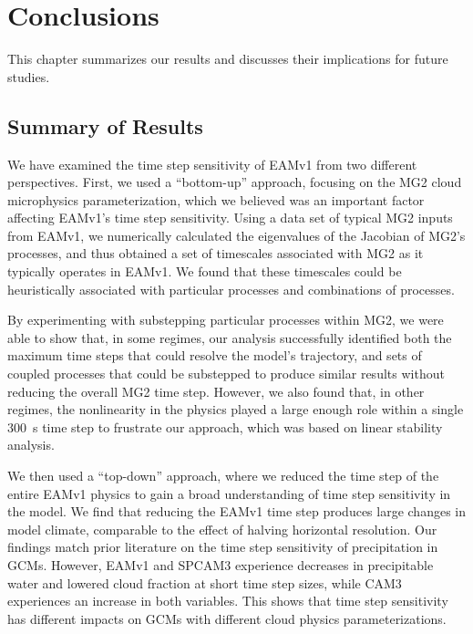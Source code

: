 \documentclass [11pt, proquest] {uwthesis}[2020/02/24]
\begin{document}
\chapter{Conclusions} \label{ch:conclusions}

This chapter summarizes our results and discusses their implications for future studies.

\section{Summary of Results} \label{sec:summary}

We have examined the time step sensitivity of EAMv1 from two different perspectives. First, we used a ``bottom-up'' approach, focusing on the MG2 cloud microphysics parameterization, which we believed was an important factor affecting EAMv1's time step sensitivity. Using a data set of typical MG2 inputs from EAMv1, we numerically calculated the eigenvalues of the Jacobian of MG2's processes, and thus obtained a set of timescales associated with MG2 as it typically operates in EAMv1. We found that these timescales could be heuristically associated with particular processes and combinations of processes.

By experimenting with substepping particular processes within MG2, we were able to show that, in some regimes, our analysis successfully identified both the maximum time steps that could resolve the model's trajectory, and sets of coupled processes that could be substepped to produce similar results without reducing the overall MG2 time step. However, we also found that, in other regimes, the nonlinearity in the physics played a large enough role within a single \SI{300}{\second} time step to frustrate our approach, which was based on linear stability analysis.

We then used a ``top-down'' approach, where we reduced the time step of the entire EAMv1 physics to gain a broad understanding of time step sensitivity in the model. We find that reducing the EAMv1 time step produces large changes in model climate, comparable to the effect of halving horizontal resolution. Our findings match prior literature on the time step sensitivity of precipitation in GCMs. However, EAMv1 and SPCAM3 experience decreases in precipitable water and lowered cloud fraction at short time step sizes, while CAM3 experiences an increase in both variables. This shows that time step sensitivity has different impacts on GCMs with different cloud physics parameterizations.
\end{document}
